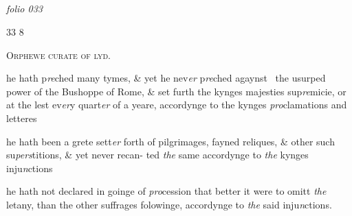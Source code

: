 \documentclass[12pt, a4paper]{book}
\begin{document}
            
\dotfill
					  \subsection*{}  \subsection*{}  \subsection*{}

\textit{folio 033}


\begin{flushright}{\color{Mahogany}33} 8\end{flushright}
 

	
				\begin{center} \begin{large} {\scshape Orphewe curate of lyd.} \end{large} \end{center}
			


				\marginpar[\vspace{0.5cm}{\textcolor{Gray}{the bisshope of Rome}}]{}
			
		\ifthenelse{\isodd{\thepage}}
		{\reversemarginpar}
		{\normalmarginpar}
		he hath p\textit{re}ched many tymes, \& yet he nev\textit{er} p\textit{re}ched agaynst 
 the usurped power of the Bushoppe of Rome, \& set
 furth the kynges majesties sup\textit{re}micie, or at the lest ev\textit{er}y
 quart\textit{er }of a yeare, accordynge to the kynges \textit{pro}clamations
 and letteres

	
				\marginpar[\vspace{0.5cm}{\textcolor{Gray}{pilgrimages}}]{}
			
	
		\ifthenelse{\isodd{\thepage}}
		{\reversemarginpar}
		{\normalmarginpar}
		he hath been a grete sett\textit{er} forth of pilgrimages, fayned
 reliques, \& other such su\textit{pers}titions, \& yet never recan-
 ted \textit{the} same accordynge to \textit{the} kynges inju\textit{n}ctions

	
		\ifthenelse{\isodd{\thepage}}
		{\reversemarginpar}
		{\normalmarginpar}
		he hath not declared in goinge of \textit{pro}cession that better it
 were to omitt \textit{the} letany, than the other suffrages
 folowinge, accordynge to \textit{the} said inju\textit{n}ctions.
\end{document}
